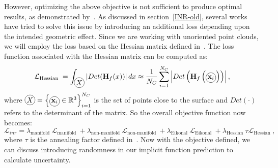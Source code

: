 However, optimizing the above objective is not sufficient to produce optimal results, as demonstrated by~\cite{DiGS, NeuralHessian}. As discussed in section~\ref{INR-old}, several works have tried to solve this issue by introducing an additional loss depending upon the intended geometric effect. Since we are working with unoriented point clouds, we will employ the loss based on the Hessian matrix defined in~\cite{NeuralHessian}. The loss function associated with the Hessian matrix can be computed as:
\begin{equation}\label{Hessian1}
    \mathcal{L}_{\text{Hessian }} = \int_{\circled{$X$}} \left|Det(\mathbf{H}_f(x))\right| d x \approx \frac{1}{N_C}\sum_{i=1}^{N_C} \left|Det\left(\mathbf{H}_f\left(\circled{$\mathbf{x}_i$}\right)\right)\right|,
\end{equation}
where $\circled{$X$}=\left\{\circled{$\mathbf{x}_i$} \in \mathbb{R}^{3}\right\}_{i=1}^{N_C}$ is the set of points close to the surface and $Det(\cdot)$ refers to the determinant of the matrix. So the overall objective function now becomes:
\begin{equation}\label{Hessian2}
    \mathcal{L}_{inr}= \lambda_{\text {manifold }} \mathcal{L}_{\text {manifold }}+\lambda_{\text {non-manifold }} \mathcal{L}_{\text {non-manifold }}+ \lambda_{\text {Eikonal }} \mathcal{L}_{\text {Eikonal }}+ \lambda_{\text{Hessian }} \tau \mathcal{L}_{\text{Hessian }},
\end{equation}
where $\tau$ is the annealing factor defined in~\cite{NeuralHessian}. Now with the objective defined, we can discuss introducing randomness in our implicit function prediction to calculate uncertainty.


